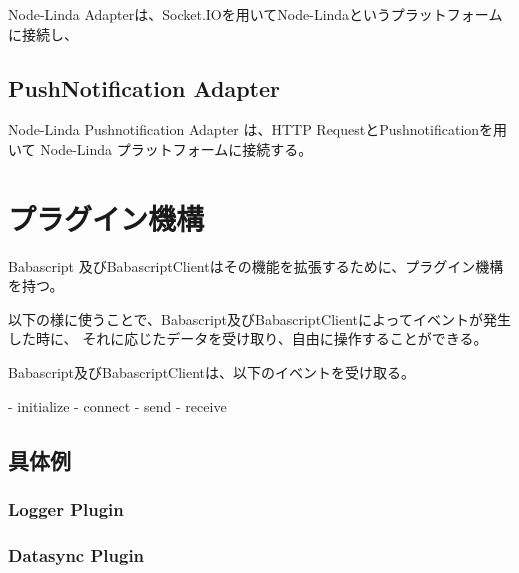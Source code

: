 Node-Linda Adapterは、Socket.IOを用いてNode-Lindaというプラットフォームに接続し、

\subsection{PushNotification Adapter}

Node-Linda Pushnotification Adapter は、HTTP RequestとPushnotificationを用いて
Node-Linda プラットフォームに接続する。

\section{プラグイン機構}

Babascript 及びBabascriptClientはその機能を拡張するために、プラグイン機構を持つ。

以下の様に使うことで、Babascript及びBabascriptClientによってイベントが発生した時に、
それに応じたデータを受け取り、自由に操作することができる。

Babascript及びBabascriptClientは、以下のイベントを受け取る。

- initialize
- connect
- send
- receive

\subsection{具体例}

\subsubsection{Logger Plugin}

\subsubsection{Datasync Plugin}
